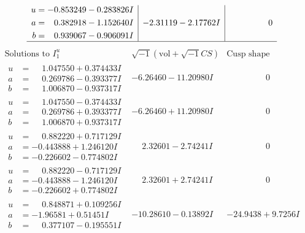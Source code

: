 \documentclass[1p]{elsarticle_modified}
\theoremstyle{definition}
\newcommand{\I}{\sqrt{-1}}
\begin{document}
$$\begin{array}{c|c|c}
\begin{aligned}
u &= -0.853249 - 0.283826 I \\
a &= \phantom{-}0.382918 - 1.152640 I \\
b &= \phantom{-}0.939067 - 0.906091 I\end{aligned}
 & -2.31119 - 2.17762 I & \phantom{-0.000000 } 0\\
 \hline 
 \end{array}$$\newpage$$\begin{array}{c|c|c}  
\text{Solutions to }I^u_{1}& \I (\text{vol} + \sqrt{-1}CS) & \text{Cusp shape}\\
 \hline 
\begin{aligned}
u &= \phantom{-}1.047550 + 0.374433 I \\
a &= \phantom{-}0.269786 - 0.393377 I \\
b &= \phantom{-}1.006870 - 0.937317 I\end{aligned}
 & -6.26460 - 11.20980 I & \phantom{-0.000000 } 0 \\ \hline\begin{aligned}
u &= \phantom{-}1.047550 - 0.374433 I \\
a &= \phantom{-}0.269786 + 0.393377 I \\
b &= \phantom{-}1.006870 + 0.937317 I\end{aligned}
 & -6.26460 + 11.20980 I & \phantom{-0.000000 } 0 \\ \hline\begin{aligned}
u &= \phantom{-}0.882220 + 0.717129 I \\
a &= -0.443888 + 1.246120 I \\
b &= -0.226602 - 0.774802 I\end{aligned}
 & \phantom{-}2.32601 - 2.74241 I & \phantom{-0.000000 } 0 \\ \hline\begin{aligned}
u &= \phantom{-}0.882220 - 0.717129 I \\
a &= -0.443888 - 1.246120 I \\
b &= -0.226602 + 0.774802 I\end{aligned}
 & \phantom{-}2.32601 + 2.74241 I & \phantom{-0.000000 } 0 \\ \hline\begin{aligned}
u &= \phantom{-}0.848871 + 0.109256 I \\
a &= -1.96581 + 0.51451 I \\
b &= \phantom{-}0.377107 - 0.195551 I\end{aligned}
 & -10.28610 - 0.13892 I & -24.9438 + 9.7256 I \\ \hline\begin{aligned}

\end{aligned}
\end{array}$$
\end{document}
